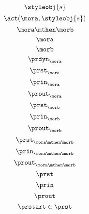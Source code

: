 {\begin{forslides}
  \begin{equation}\label{eq:signal}
  \styleobj{s}
  \end{equation}
  \begin{equation}\label{eq:signal-apply}
    \act(\mora, \styleobj{s})
    \end{equation}
    \begin{equation}\label{eq:morab}
      \mora \mthen \morb
      \end{equation}
      \begin{equation}\label{eq:mora}
        \mora
        \end{equation}
        \begin{equation}\label{eq:morb}
          \morb
          \end{equation}
          \begin{equation}\label{eq:mora-prdyn}
            \prdyn_{\mora}
            \end{equation}
\begin{equation}\label{eq:mora-prst}
\prst_{\mora}
\end{equation}
\begin{equation}\label{eq:mora-prin}
\prin_{\mora}
\end{equation}
\begin{equation}\label{eq:mora-prout}
\prout_{\mora}
\end{equation}
\begin{equation}\label{eq:morb-prst}
  \prst_{\morb}
  \end{equation}
  \begin{equation}\label{eq:morb-prin}
  \prin_{\morb}
  \end{equation}
  \begin{equation}\label{eq:morb-prout}
  \prout_{\morb}
  \end{equation}
  \begin{equation}\label{eq:morab-prst}
    \prst_{\mora\mthen\morb}
    \end{equation}
    \begin{equation}\label{eq:morab-prin}
    \prin_{\mora\mthen\morb}
    \end{equation}
    \begin{equation}\label{eq:morab-prout}
    \prout_{\mora\mthen\morb}
    \end{equation}
  \begin{equation}\label{eq:gen-prst}
    \prst
    \end{equation}
    \begin{equation}\label{eq:gen-prin}
    \prin
    \end{equation}
    \begin{equation}\label{eq:gen-prout}
    \prout
    \end{equation}
      \begin{equation}\label{eq:moore-start}
    \prstart \in \prst
  \end{equation}


\end{forslides}}
